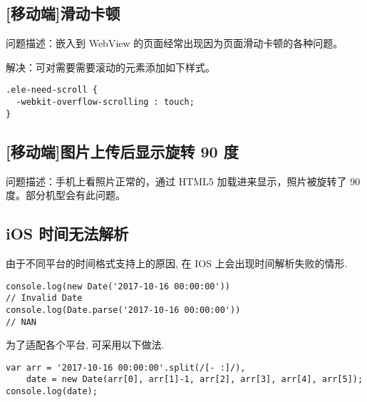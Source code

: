 \subsection{{[}移动端{]}滑动卡顿}\label{ux79fbux52a8ux7aefux6ed1ux52a8ux5361ux987f}

问题描述：嵌入到 WebView 的页面经常出现因为页面滑动卡顿的各种问题。

解决：可对需要需要滚动的元素添加如下样式。

\begin{lstlisting}
.ele-need-scroll {
  -webkit-overflow-scrolling : touch;
}
\end{lstlisting}

\subsection{{[}移动端{]}图片上传后显示旋转 90
度}\label{ux79fbux52a8ux7aefux56feux7247ux4e0aux4f20ux540eux663eux793aux65cbux8f6c-90-ux5ea6}

问题描述：手机上看照片正常的，通过 HTML5 加载进来显示，照片被旋转了 90
度。部分机型会有此问题。

\subsection{iOS
时间无法解析}\label{ios-ux65f6ux95f4ux65e0ux6cd5ux89e3ux6790}

由于不同平台的时间格式支持上的原因, 在 IOS 上会出现时间解析失败的情形.

\begin{lstlisting}
console.log(new Date('2017-10-16 00:00:00'))
// Invalid Date
console.log(Date.parse('2017-10-16 00:00:00'))
// NAN
\end{lstlisting}

为了适配各个平台, 可采用以下做法.

\begin{lstlisting}
var arr = '2017-10-16 00:00:00'.split(/[- :]/),
    date = new Date(arr[0], arr[1]-1, arr[2], arr[3], arr[4], arr[5]);
console.log(date);
\end{lstlisting}

